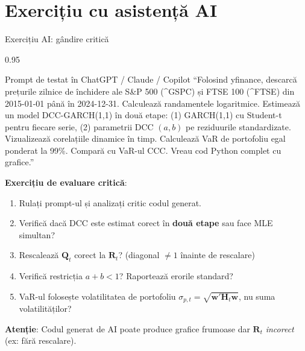 \documentclass[9pt, aspectratio=169, t]{beamer}
\begin{document}
\section{Exercițiu cu asistență AI}

\begin{frame}{Exercițiu AI: gândire critică}
    \begin{cminipage}{0.95\textwidth}
    \vspace{-3mm}
    \begin{block}{\footnotesize Prompt de testat în ChatGPT / Claude / Copilot}
        {\footnotesize
        ``Folosind yfinance, descarcă prețurile zilnice de închidere ale S\&P 500 (\^{}GSPC) și FTSE 100 (\^{}FTSE) din 2015-01-01 până în 2024-12-31. Calculează randamentele logaritmice. Estimează un model DCC-GARCH(1,1) în două etape: (1) GARCH(1,1) cu Student-t pentru fiecare serie, (2) parametrii DCC $(a, b)$ pe reziduurile standardizate. Vizualizează corelațiile dinamice în timp. Calculează VaR de portofoliu egal ponderat la 99\%. Compară cu VaR-ul CCC. Vreau cod Python complet cu grafice.''
        }
    \end{block}
    \vspace{-2mm}
    {\footnotesize
    \textbf{Exercițiu de evaluare critică}:
    \begin{enumerate}\setlength{\itemsep}{0pt}
        \item Rulați prompt-ul și analizați critic codul generat.
        \item Verifică dacă DCC este estimat corect în \textbf{două etape} sau face MLE simultan?
        \item Rescalează $\mathbf{Q}_t$ corect la $\mathbf{R}_t$? (diagonal $\neq 1$ înainte de rescalare)
        \item Verifică restricția $a + b < 1$? Raportează erorile standard?
        \item VaR-ul folosește volatilitatea de portofoliu $\sigma_{p,t} = \sqrt{\mathbf{w}'\mathbf{H}_t\mathbf{w}}$, nu suma volatilităților?
    \end{enumerate}
    }
    \vspace{-2mm}
    \begin{alertblock}{}
        {\footnotesize \textbf{Atenție}: Codul generat de AI poate produce grafice frumoase dar $\mathbf{R}_t$ \textit{incorect} (ex: fără rescalare).}
    \end{alertblock}
    \end{cminipage}
\end{frame}
\end{document}
